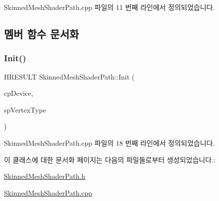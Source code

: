 Skinned\+Mesh\+Shader\+Path.\+cpp 파일의 11 번째 라인에서 정의되었습니다.



\subsection{멤버 함수 문서화}
\mbox{\label{class_m_n_l_1_1_skinned_mesh_shader_path_ae9c2c3747940326041af556e07ba13be}} 
\subsubsection{\texorpdfstring{Init()}{Init()}}
{\footnotesize\ttfamily H\+R\+E\+S\+U\+LT Skinned\+Mesh\+Shader\+Path\+::\+Init (\begin{DoxyParamCaption}\item[{const \hyperlink{namespace_m_n_l_a1eec210db8f309a4a9ac0d9658784c31}{C\+P\+D3\+D\+Device} \&}]{cp\+Device,  }\item[{const std\+::shared\+\_\+ptr$<$ \hyperlink{class_m_n_l_1_1_mn_custom_vertex_type}{Mn\+Custom\+Vertex\+Type} $>$ \&}]{sp\+Vertex\+Type }\end{DoxyParamCaption})}



Skinned\+Mesh\+Shader\+Path.\+cpp 파일의 18 번째 라인에서 정의되었습니다.



이 클래스에 대한 문서화 페이지는 다음의 파일들로부터 생성되었습니다.\+:\begin{DoxyCompactItemize}
\item 
\hyperlink{_skinned_mesh_shader_path_8h}{Skinned\+Mesh\+Shader\+Path.\+h}\item 
\hyperlink{_skinned_mesh_shader_path_8cpp}{Skinned\+Mesh\+Shader\+Path.\+cpp}\end{DoxyCompactItemize}
